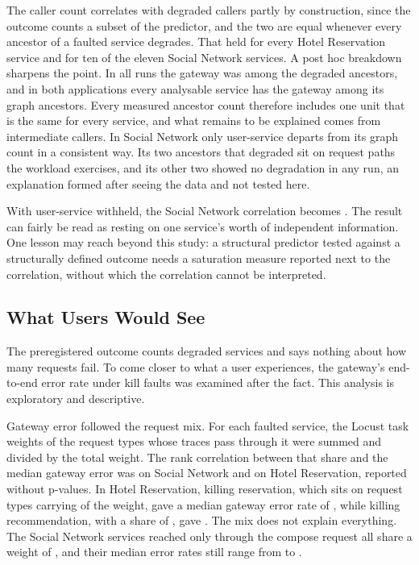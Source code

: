 The caller count correlates with degraded callers partly by construction, since the outcome
counts a subset of the predictor, and the two are equal whenever every ancestor of a faulted
service degrades. That held for every Hotel Reservation service and for ten of the eleven
Social Network services. %
A post hoc breakdown sharpens the point. In all  runs the gateway was among the
degraded ancestors, %
and in both applications every analysable service has the gateway among its graph ancestors.
Every measured ancestor count therefore includes one unit that is the same for every service,
and what remains to be explained comes from intermediate callers. In Social Network only
user-service departs from its graph count in a consistent way. Its two ancestors that degraded
sit on request paths the workload exercises, and its other two showed no degradation in any run,
an explanation formed after seeing the data and not tested here.

With user-service withheld, the Social Network correlation becomes .
The result can fairly be read as resting on one service's worth of independent information. One
lesson may reach beyond this study: a structural predictor tested against a structurally defined
outcome needs a saturation measure reported next to the correlation, without which the
correlation cannot be interpreted.

\subsection{What Users Would See}
\label{sec:disc-users}

The preregistered outcome counts degraded services and says nothing about how many requests
fail. To come closer to what a user experiences, the gateway's end-to-end error rate under kill
faults was examined after the fact. This analysis is exploratory and descriptive.

Gateway error followed the request mix. For each faulted service, the Locust task weights of the
request types whose traces pass through it were summed and divided by the total weight. The rank
correlation between that share and the median gateway error was
 on Social Network and  on
Hotel Reservation, reported without p-values. In Hotel Reservation, killing reservation, which
sits on request types carrying  of the weight, gave a median
gateway error rate of , while killing recommendation, with a
share of , gave .
The mix does not explain everything. The Social Network services reached only through the
compose request all share a weight of , and their
median error rates still range from  to
.

